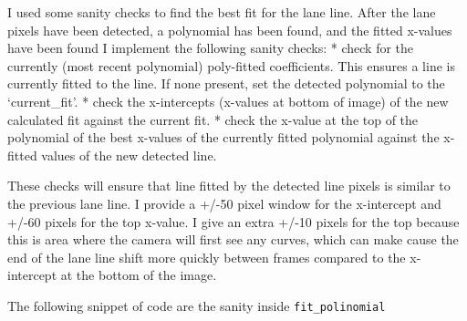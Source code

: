 \documentclass[11pt]{article}
\begin{document}
I used some sanity checks to find the best fit for the lane line. After
the lane pixels have been detected, a polynomial has been found, and the
fitted x-values have been found I implement the following sanity checks:
* check for the currently (most recent polynomial) poly-fitted
coefficients. This ensures a line is currently fitted to the line. If
none present, set the detected polynomial to the `current\_fit'. * check
the x-intercepts (x-values at bottom of image) of the new calculated fit
against the current fit. * check the x-value at the top of the
polynomial of the best x-values of the currently fitted polynomial
against the x-fitted values of the new detected line.

These checks will ensure that line fitted by the detected line pixels is
similar to the previous lane line. I provide a +/-50 pixel window for
the x-intercept and +/-60 pixels for the top x-value. I give an extra
+/-10 pixels for the top because this is area where the camera will
first see any curves, which can make cause the end of the lane line
shift more quickly between frames compared to the x-intercept at the
bottom of the image.

The following snippet of code are the sanity inside
\texttt{fit\_polinomial}
\end{document}
